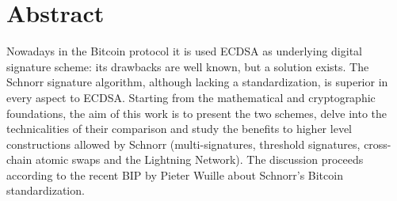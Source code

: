 \chapter{Abstract}
\label{chpr:abstract}
Nowadays in the Bitcoin protocol it is used ECDSA as underlying digital signature scheme: its drawbacks are well known, but a solution exists. The Schnorr signature algorithm, although lacking a standardization, is superior in every aspect to ECDSA. Starting from the mathematical and cryptographic foundations, the aim of this work is to present the two schemes, delve into the technicalities of their comparison and study the benefits to higher level constructions allowed by Schnorr (multi-signatures, threshold signatures, cross-chain atomic swaps and the Lightning Network). The discussion proceeds according to the recent BIP by Pieter Wuille about Schnorr's Bitcoin standardization.